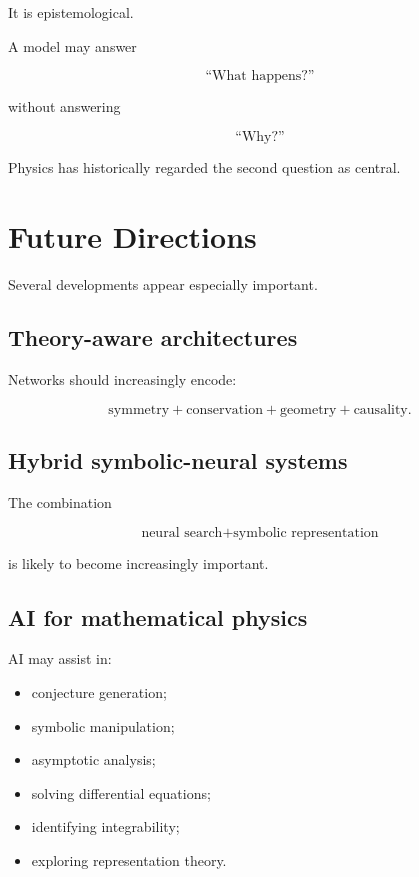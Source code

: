 \documentclass[11pt,a4paper,oneside]{book}
\begin{document}
It is epistemological.

A model may answer

\begin{equation}
\text{``What happens?''}
\end{equation}

without answering

\begin{equation}
\text{``Why?''}
\end{equation}

Physics has historically regarded the second question as central.

\chapter{Future Directions}

Several developments appear especially important.

\section{Theory-aware architectures}

Networks should increasingly encode:

\begin{equation}
\text{symmetry}
+
\text{conservation}
+
\text{geometry}
+
\text{causality}.
\end{equation}

\section{Hybrid symbolic-neural systems}

The combination

\begin{equation}
\text{neural search}
+
\text{symbolic representation}
\end{equation}

is likely to become increasingly important.

\section{AI for mathematical physics}

AI may assist in:

\begin{itemize}
\item conjecture generation;
\item symbolic manipulation;
\item asymptotic analysis;
\item solving differential equations;
\item identifying integrability;
\item exploring representation theory.
\end{itemize}
\end{document}

